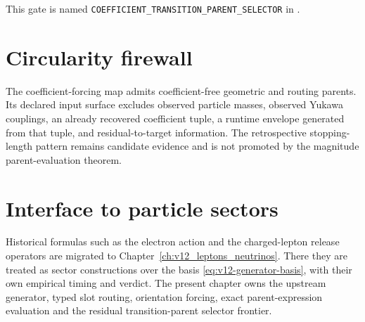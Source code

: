 This gate is named \texttt{COEFFICIENT\_TRANSITION\_PARENT\_SELECTOR} in
.

\section{Circularity firewall}
The coefficient-forcing map admits coefficient-free geometric and routing
parents. Its declared input surface excludes observed particle masses,
observed Yukawa couplings, an already recovered coefficient tuple, a runtime
envelope generated from that tuple, and residual-to-target information. The
retrospective stopping-length pattern remains candidate evidence and is not
promoted by the magnitude parent-evaluation theorem.

\section{Interface to particle sectors}
Historical formulas such as the electron action and the charged-lepton release
operators are migrated to Chapter~\ref{ch:v12_leptons_neutrinos}. There they
are treated as sector constructions over the basis
\eqref{eq:v12-generator-basis}, with their own empirical timing and verdict.
The present chapter owns the upstream generator, typed slot routing, orientation
forcing, exact parent-expression evaluation and the residual transition-parent
selector frontier.

\clearpage
